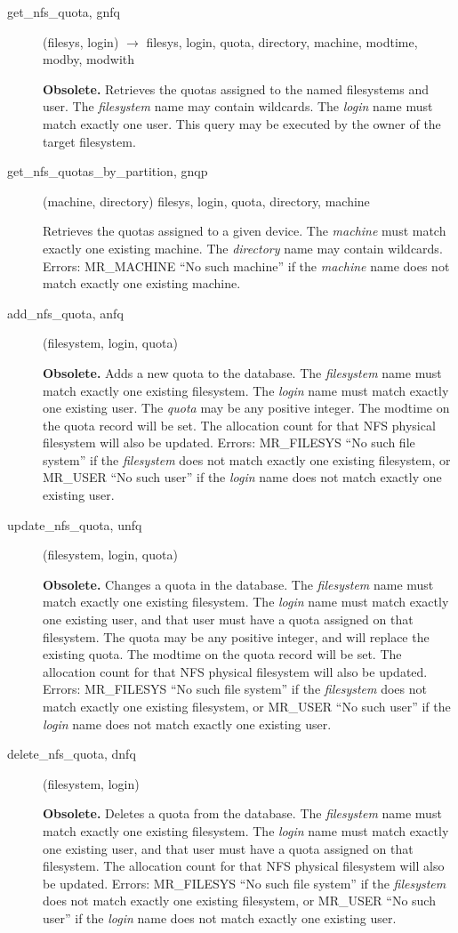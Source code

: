 \begin{description}
\item[get\_nfs\_quota, gnfq](filesys, login) $\rightarrow$ filesys,
login, quota, directory, machine, modtime, modby, modwith

{\bf Obsolete.}
Retrieves the quotas assigned to the named filesystems and user.  The
{\em filesystem} name may contain wildcards.  The {\em login} name must
match exactly one user.  This query may be executed by the owner of
the target filesystem.

\item[get\_nfs\_quotas\_by\_partition, gnqp](machine, directory)
filesys, login, quota, directory, machine

Retrieves the quotas assigned to a given device.  The {\em machine} must
match exactly one existing machine.  The {\em directory} name may
contain wildcards.  Errors: MR\_MACHINE ``No such machine'' if the
{\em machine} name does not match exactly one existing machine.

\item[add\_nfs\_quota, anfq](filesystem, login, quota)

{\bf Obsolete.}
Adds a new quota to the database.  The {\em filesystem} name must match
exactly one existing filesystem.  The {\em login} name must match
exactly one existing user.  The {\em quota} may be any positive
integer.  The modtime on the quota record will be set.  The allocation
count for that NFS physical filesystem will also be updated.  Errors:
MR\_FILESYS ``No such file system'' if the {\em filesystem} does not match
exactly one existing filesystem, or MR\_USER ``No such user'' if the
{\em login} name does not match exactly one existing user.

\item[update\_nfs\_quota, unfq](filesystem, login, quota)

{\bf Obsolete.}
Changes a quota in the database.  The {\em filesystem} name must match
exactly one existing filesystem.  The {\em login} name must match
exactly one existing user, and that user must have a quota assigned on
that filesystem.  The quota may be any positive integer, and will
replace the existing quota.  The modtime on the quota record will be
set.  The allocation count for that NFS physical filesystem will also
be updated.  Errors: MR\_FILESYS ``No such file system'' if the
{\em filesystem} does not match exactly one existing filesystem, or
MR\_USER ``No such user'' if the {\em login} name does not match exactly
one existing user.

\item[delete\_nfs\_quota, dnfq](filesystem, login)

{\bf Obsolete.}
Deletes a quota from the database.  The {\em filesystem} name must match
exactly one existing filesystem.  The {\em login} name must match
exactly one existing user, and that user must have a quota assigned on
that filesystem.  The allocation count for that NFS physical
filesystem will also be updated.  Errors: MR\_FILESYS ``No such file
system'' if the {\em filesystem} does not match exactly one existing
filesystem, or MR\_USER ``No such user'' if the {\em login} name does not
match exactly one existing user.

\end{description}

